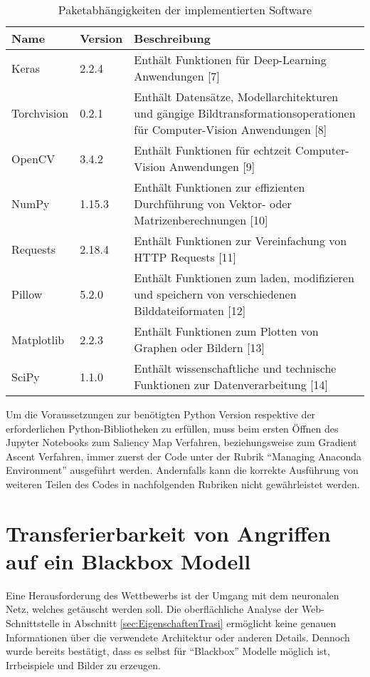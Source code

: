 \begin{table}
	\centering
	\begin{tabular}{|l|l|p{10.4cm}|}
		\hline 
		Name & Version & Beschreibung \\ 
		\hline\hline 
		Keras& 2.2.4  & Enthält Funktionen für Deep-Learning Anwendungen [7] \\ 
		\hline 
		Torchvision& 0.2.1 & Enthält Datensätze, Modellarchitekturen und gängige Bildtransformationsoperationen für Computer-Vision Anwendungen [8] \\ 
		\hline 
		OpenCV& 3.4.2  & Enthält Funktionen für echtzeit Computer-Vision Anwendungen [9] \\ 
		\hline 
		NumPy&  1.15.3& Enthält Funktionen zur effizienten Durchführung von Vektor- oder Matrizenberechnungen [10] \\ 
		\hline 
		Requests& 2.18.4 & Enthält Funktionen zur Vereinfachung von HTTP Requests [11] \\ 
		\hline 
		Pillow& 5.2.0 & Enthält Funktionen zum laden, modifizieren und speichern von verschiedenen Bilddateiformaten [12] \\ 
		\hline 
		Matplotlib& 2.2.3 & Enthält Funktionen zum Plotten von Graphen oder Bildern [13] \\ 
		\hline 
		SciPy& 1.1.0  & Enthält wissenschaftliche und technische Funktionen zur Datenverarbeitung [14] \\ 
		\hline 
	\end{tabular} 
	\caption{Paketabhängigkeiten der implementierten Software}
	\label{tab:parameter}
\end{table}

Um die Voraussetzungen zur benötigten Python Version respektive der erforderlichen Python-Bibliotheken zu erfüllen, muss beim ersten Öffnen des Jupyter Notebooks zum Saliency Map Verfahren, beziehungsweise zum Gradient Ascent Verfahren, immer zuerst der Code unter der Rubrik “Managing Anaconda Environment” ausgeführt werden. Andernfalls kann die korrekte Ausführung von weiteren Teilen des Codes in nachfolgenden Rubriken nicht gewährleistet werden.

\section{Transferierbarkeit von Angriffen auf ein Blackbox Modell}


\label{sec:TrasiModell}
Eine Herausforderung des Wettbewerbs ist der Umgang mit dem neuronalen Netz, welches getäuscht werden soll. Die oberflächliche Analyse der Web-Schnittstelle in Abschnitt \ref{sec:EigenschaftenTrasi} ermöglicht keine genauen Informationen über die verwendete Architektur oder anderen Details. Dennoch wurde bereits bestätigt, dass es selbst für “Blackbox” Modelle möglich ist, Irrbeispiele und Bilder zu erzeugen.


